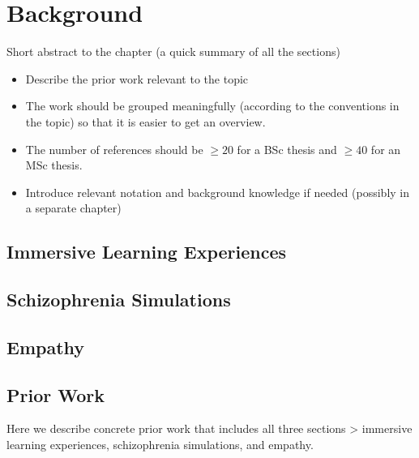 \chapter{Background}
\label{ch:background}

Short abstract to the chapter (a quick summary of all the sections)

\begin{itemize}
\item Describe the prior work relevant to the topic
\item The work should be grouped meaningfully (according to the conventions in the topic) so that it is easier to get an overview.
\item The number of references should be $\ge 20$ for a BSc thesis and $\ge 40$ for an MSc thesis.
\item Introduce relevant notation and background knowledge if needed (possibly in a separate chapter)
\end{itemize}

\section{Immersive Learning Experiences}

\section{Schizophrenia Simulations}

\section{Empathy}

\section{Prior Work}
Here we describe concrete prior work that includes all three sections > immersive learning experiences, schizophrenia simulations, and empathy.

